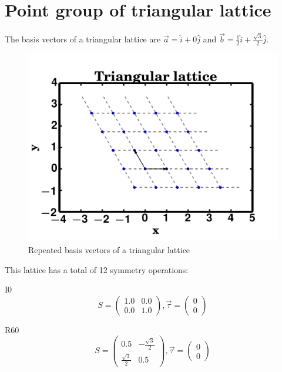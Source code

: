 \documentclass[12pt, fleqn]{article}
\begin{document}
\section{Point group of triangular lattice}
The basis vectors of a triangular lattice are $\vec{a}=\hat{i}+0\hat{j}$
and $\vec{b}=\frac{1}{2}\hat{i}+\frac{\sqrt{3}}{2}\hat{j}$.

\begin{figure}[h]
    \begin{center}
        \includegraphics[max width=\textwidth]{./triangular.png}
    \end{center}
    \caption{Repeated basis vectors of a triangular lattice}
    \label{fig:triangular}
\end{figure}

This lattice has a total of 12 symmetry operations:

I0
\begin{equation}
    S=
    \begin{pmatrix}
        1.0&0.0\\
        0.0&1.0
    \end{pmatrix}
    ,\vec{\tau}=
    \begin{pmatrix}
        0\\
        0
    \end{pmatrix}
    \label{I0}
\end{equation}

R60
\begin{equation}
    S=
    \begin{pmatrix}
        0.5&-\frac{\sqrt{3}}{2}\\
        \frac{\sqrt{3}}{2}&0.5
    \end{pmatrix}
    ,\vec{\tau}=
    \begin{pmatrix}
        0\\
        0
    \end{pmatrix}
    \label{R60}
\end{equation}
\end{document}
